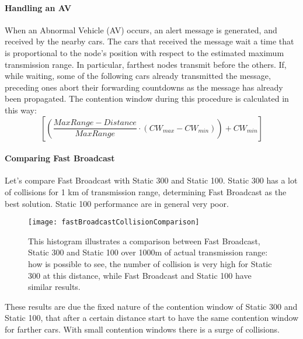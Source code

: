 \paragraph*{Handling an AV} When an Abnormal Vehicle (AV) occurs, an alert
message is generated, and received by the nearby cars. The cars that received
the message wait a time that is proportional to the node's position with
respect to the estimated maximum transmission range. In particular, farthest
nodes transmit before the others. If, while waiting, some of the following cars
already transmitted the message, preceding ones abort their forwarding 
countdowns as the message has already been propagated. The contention window 
during this procedure is calculated in this way:
\begin{equation}
\left [ \left ( \frac{MaxRange - Distance}{MaxRange} \cdot (CW_{max} - CW_{min}) \right ) + CW_{min} \right ]
\end{equation}

\paragraph*{Comparing Fast Broadcast}
Let's compare Fast Broadcast with Static 300 and Static 100. Static 300 has a
lot of collisions for 1 km of transmission range, determining Fast Broadcast as
the best solution. Static 100 performance are in general very poor.

\begin{figure}[t]
  \centering
  \texttt{[image: fastBroadcastCollisionComparison]}
  \caption[Fast broadcast comparison]{This histogram illustrates a comparison
    between Fast Broadcast, Static 300 and Static 100 over 1000m of actual
    transmission range: how is possible to see, the number of collision is very
    high for Static 300 at this distance, while Fast Broadcast and Static 100
    have similar results.}
  \label{fig:802.11ws:fastBroadCastComparison}
\end{figure}

These results are due the fixed nature of the contention window of Static 300
and Static 100, that after a certain distance start to have the same contention
window for farther cars. With small contention windows there is a surge of
collisions.
